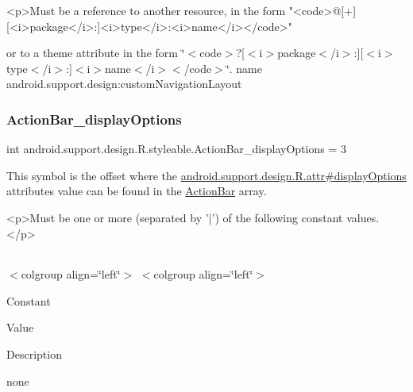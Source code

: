 \begin{DoxyVerb}      <p>Must be a reference to another resource, in the form "<code>@[+][<i>package</i>:]<i>type</i>:<i>name</i></code>"
\end{DoxyVerb}
 or to a theme attribute in the form \char`\"{}$<$code$>$?\mbox{[}$<$i$>$package$<$/i$>$\+:\mbox{]}\mbox{[}$<$i$>$type$<$/i$>$\+:\mbox{]}$<$i$>$name$<$/i$>$$<$/code$>$\char`\"{}.  name android.\+support.\+design\+:custom\+Navigation\+Layout \mbox{\label{classandroid_1_1support_1_1design_1_1R_1_1styleable_abddf5b63a010ab2e2078e9c46e36e80c}} 
\subsubsection{\texorpdfstring{Action\+Bar\+\_\+display\+Options}{ActionBar\_displayOptions}}
{\footnotesize\ttfamily int android.\+support.\+design.\+R.\+styleable.\+Action\+Bar\+\_\+display\+Options = 3\hspace{0.3cm}{\ttfamily [static]}}

This symbol is the offset where the \hyperlink{classandroid_1_1support_1_1design_1_1R_1_1attr_a17a2e287c786fb6fbf1e77f6b90877c7}{android.\+support.\+design.\+R.\+attr\#display\+Options} attribute\textquotesingle{}s value can be found in the \hyperlink{classandroid_1_1support_1_1design_1_1R_1_1styleable_ab795220a96557d11f8c21359b95bed82}{Action\+Bar} array.

\begin{DoxyVerb}      <p>Must be one or more (separated by '|') of the following constant values.</p>
\end{DoxyVerb}
 \tabulinesep=1mm
\begin{longtabu} spread 0pt [c]{*{0}{|X[-1]}|}
\hline
\end{longtabu}
$<$colgroup align=\char`\"{}left\char`\"{}$>$ $<$colgroup align=\char`\"{}left\char`\"{}$>$ 

Constant

Value

Description 

{\ttfamily none}

